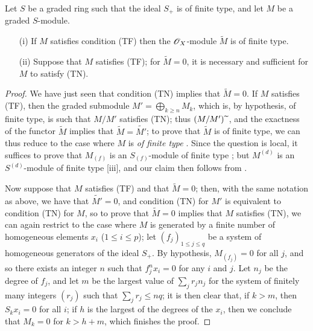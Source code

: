 \begin{proposition}[2.7.3]
\label{II.2.7.3}
Let $S$ be a graded ring such that the ideal $S_+$ is of finite type, and let $M$ be a graded $S$-module.
\begin{enumerate}
  \item[{\rm(i)}] If $M$ satisfies condition (TF) then the $\mathscr{O}_X$-module $\widetilde{M}$ is of finite type.
  \item[{\rm(ii)}] Suppose that $M$ satisfies (TF);
    for $\widetilde{M}=0$, it is necessary and sufficient for $M$ to satisfy (TN).
\end{enumerate}
\end{proposition}

\begin{proof}
We have just seen that condition (TN) implies that $\widetilde{M}=0$.
If $M$ satisfies (TF), then the graded submodule $M'=\bigoplus_{k\geq n}M_k$, which is, by hypothesis, of finite type, is such that $M/M'$ satisfies (TN);
thus $(M/M'){\,\widetilde{\,}\,}$, and the exactness of the functor $\widetilde{M}$  implies that $\widetilde{M}=\widetilde{M'}$;
to prove that $\widetilde{M}$ is of finite type, we can thus reduce to the case where $M$ is \emph{of finite type} .
Since the question is local, it suffices to prove that $M_{(f)}$ is an $S_{(f)}$-module of finite type ;
but $M^{(d)}$ is an $S^{(d)}$-module of finite type [iii], and our claim then follows from .

Now suppose that $M$ satisfies (TF) and that $\widetilde{M}=0$;
then, with the same notation as above, we have that $\widetilde{M'}=0$, and condition (TN) for $M'$ is equivalent to condition (TN) for $M$, so to prove that $\widetilde{M}=0$ implies that $M$ satisfies (TN), we can again restrict to the case where $M$ is generated by a finite number of homogeneous elements $x_i$ ($1\leq i\leq p$);
let $(f_j)_{1\leq j\leq q}$ be a system of homogeneous generators of the ideal $S_+$.
By hypothesis, $M_{(f_j)}=0$ for all $j$, and so there exists an integer $n$ such that $f_j^nx_i=0$ for any $i$ and $j$.
Let $n_j$ be the degree of $f_j$, and let $m$ be the largest value of $\sum_j r_jn_j$ for the system of finitely many integers $(r_j)$ such that $\sum_j r_j\leq nq$;
it is then clear
that, if $k>m$, then $S_kx_i=0$ for all $i$;
if $h$ is the largest of the degrees of the $x_i$, then we conclude that $M_k=0$ for $k>h+m$, which finishes the proof.
\end{proof}

